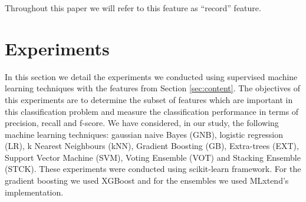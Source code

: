 Throughout this paper we will refer to this feature as ``record'' feature.





\section{Experiments}\label{sec:exp}


In this section we detail the experiments we conducted using supervised machine
learning techniques with the features from Section \ref{sec:content}.
The objectives of this experiments are to determine the subset of features which
are important in this classification problem and measure the classification
performance in terms of precision, recall and f-score.
We have considered, in our study, the following machine learning techniques:
gaussian naive Bayes (GNB), logistic regression (LR), k Nearest Neighbours
(kNN), Gradient Boosting (GB), Extra-trees (EXT), Support Vector Machine (SVM),
Voting Ensemble (VOT) and Stacking Ensemble (STCK). These experiments were
conducted using scikit-learn\cite{scikit-learn} framework. For the gradient
boosting we used XGBoost\cite{Chen:2016:XST:2939672.2939785}
and for the ensembles we used MLxtend's\cite{raschkas_2018_mlxtend}
implementation.

